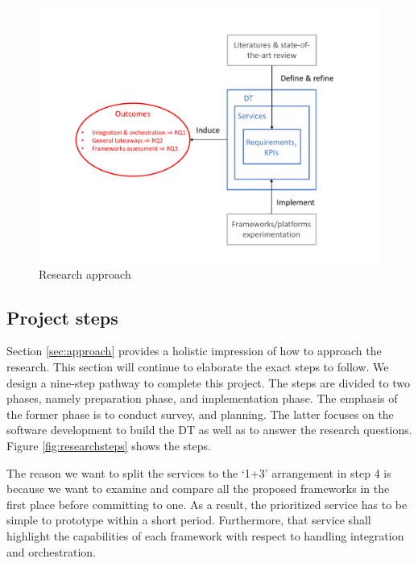 \documentclass[journal,onecolumn]{IEEEtran} %
\begin{document}
 \begin{figure}[hbt!]
  \centering
  \includegraphics[scale=0.5]{figures/approach.pdf}
  \caption{Research approach}
  \label{fig:approach}
\end{figure}

\subsection{Project steps}\label{sec:prostep}
Section \ref{sec:approach} provides a holistic impression of how to approach the research. This section will continue to elaborate the exact steps to follow. We design a nine-step pathway to complete this project. The steps are divided to two phases, namely preparation phase, and implementation phase. The emphasis of the former phase is to conduct survey, and planning. The latter focuses on the software development to build the DT as well as to answer the research questions. Figure \ref{fig:researchsteps} shows the steps.

The reason we want to split the services to the `1+3' arrangement in step 4 is because we want to examine and compare all the proposed frameworks in the first place before committing to one. As a result, the prioritized service has to be simple to prototype within a short period. Furthermore, that service shall highlight the capabilities of each framework with respect to handling integration and orchestration.
\end{document}
